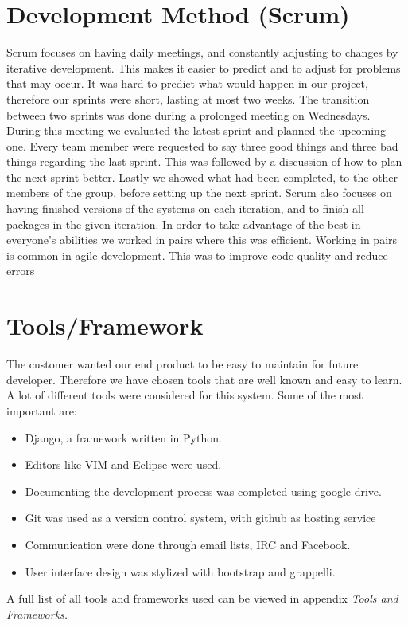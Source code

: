 \section{Development Method (Scrum)}
Scrum focuses on having daily meetings, and constantly adjusting to
changes by iterative development. This makes it easier to predict and
to adjust for problems that may occur. It was hard to predict what
would happen in our project, therefore our sprints were short, lasting
at most two weeks. The transition between two sprints was done during a
prolonged meeting on Wednesdays. During this meeting we evaluated the
latest sprint and planned the upcoming one. Every team member were
requested to say three good things and three bad things regarding the
last sprint. This was followed by a discussion of how to plan the next
sprint better. Lastly we showed what had been completed, to the other
members of the group, before setting up the next sprint. Scrum also
focuses on having finished versions of the systems on each iteration,
and to finish all packages in the given iteration.
In order to take advantage of the best in everyone's
abilities we worked in pairs where this was efficient. Working in pairs
is common in agile development. This was to improve code quality and
reduce errors

\section{Tools/Framework}
The customer wanted our end product to be easy to maintain for future
developer. Therefore we have chosen tools that are well known and easy
to learn. A lot of different tools were considered for this system. Some of the
most important are:

\begin{itemize}
    \item Django, a framework written in Python.
    \item Editors like VIM and Eclipse were used. 
    \item Documenting the development process was completed using google drive.
    \item Git was used as a version control system, with github as hosting
        service
    \item Communication were done through email lists, IRC and Facebook. 
    \item User interface design was stylized with bootstrap and grappelli. 
\end{itemize}
A full list of all tools and frameworks used can be viewed in appendix
\textit{Tools and Frameworks.}

